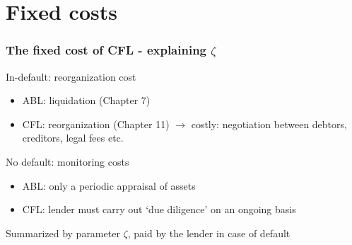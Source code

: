 \documentclass[notes]{beamer}
\begin{document}
\section{Fixed costs}
\begin{frame}[label=slide2]
\frametitle{The fixed cost of CFL - explaining $\zeta$ }
In-default:  reorganization cost
\begin{itemize}
\item ABL: liquidation (Chapter 7) 
\item CFL: reorganization (Chapter 11) $\rightarrow$ costly: negotiation between debtors, creditors, legal fees etc.
\end{itemize} \vspace{3mm}
No default: monitoring costs
\begin{itemize}
\item ABL: only a periodic appraisal of assets
\item CFL: lender must carry out `due diligence' on an ongoing basis
\end{itemize} 	\vspace{3mm}
Summarized by parameter $\zeta$, paid by the lender in case of default

\end{frame}
\end{document}
